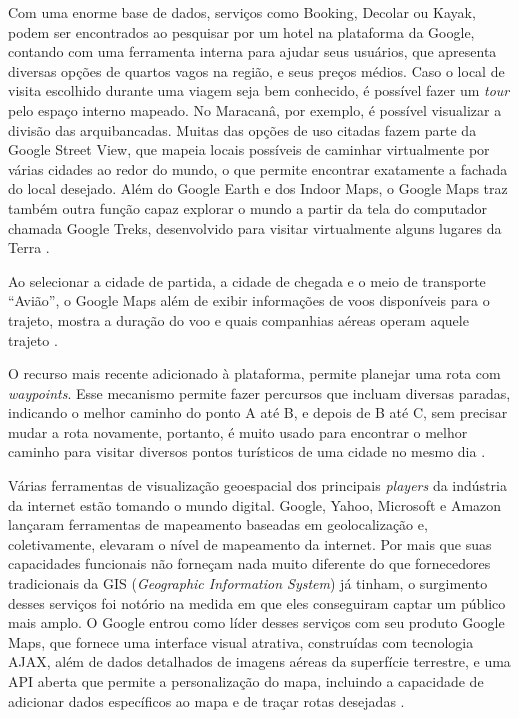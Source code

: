 Com uma enorme base de dados, serviços como Booking, Decolar ou Kayak, podem ser encontrados ao pesquisar por um hotel na plataforma da Google, contando com uma ferramenta interna para ajudar seus usuários, que apresenta diversas opções de quartos vagos na região, e seus preços médios. Caso o local de visita escolhido durante uma viagem seja bem conhecido, é possível fazer um \textit{tour} pelo espaço interno mapeado. No Maracanâ, por exemplo, é possível visualizar a divisão das arquibancadas. Muitas das opções de uso citadas fazem parte da Google Street View, que mapeia locais possíveis de caminhar virtualmente por várias cidades ao redor do mundo, o que permite encontrar exatamente a fachada do local desejado. Além do Google Earth e dos Indoor Maps, o Google Maps traz também outra função capaz explorar o mundo a partir da tela do computador chamada Google Treks, desenvolvido para visitar virtualmente alguns lugares da Terra \cite{google:2019}.

Ao selecionar a cidade de partida, a cidade de chegada e o meio de transporte “Avião”, o Google Maps além de exibir informações de voos disponíveis para o trajeto, mostra a duração do voo e quais companhias aéreas operam aquele trajeto \cite{google:2019}. 

O recurso mais recente adicionado à plataforma, permite planejar uma rota com \textit{waypoints}. Esse mecanismo permite fazer percursos que incluam diversas paradas, indicando o melhor caminho do ponto A até B, e depois de B até C, sem precisar mudar a rota novamente, portanto, é muito usado para encontrar o melhor caminho para visitar diversos pontos turísticos de uma cidade no mesmo dia \cite{google:2019}.

Várias ferramentas de visualização geoespacial dos principais \textit{players} da indústria da internet estão tomando o mundo digital. Google, Yahoo, Microsoft e Amazon lançaram ferramentas de mapeamento baseadas em geolocalização e, coletivamente, elevaram o nível de mapeamento da internet. Por mais que suas capacidades funcionais não forneçam nada muito diferente do que fornecedores tradicionais da GIS (\textit{Geographic Information System}) já tinham, o surgimento desses serviços foi notório na medida em que eles conseguiram captar um público mais amplo. O Google entrou como líder desses serviços com seu produto Google Maps, que fornece uma interface visual atrativa, construídas com tecnologia AJAX, além de dados detalhados de imagens aéreas da superfície terrestre, e uma API aberta que permite a personalização do mapa, incluindo a capacidade de adicionar dados específicos ao mapa e de traçar rotas desejadas \cite{geospatial:2009}.

